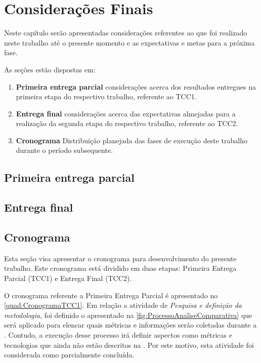 \chapter{Considerações Finais}

Neste capítulo serão apresentadas considerações referentes ao que foi realizado
neste trabalho até o presente momento e as expectativas e metas para a próxima
fase.

  As seções estão dispostas em:

  \begin{enumerate}
    \item \textbf{Primeira entrega parcial} considerações acerca dos resultados
    entregues na primeira etapa do respectivo trabalho, referente ao TCC1.
    \item \textbf{Entrega final} considerações acerca das expectativas almejadas
    para a realização da segunda etapa do respectivo trabalho, referente ao TCC2.
    \item \textbf{Cronograma} Distribuição planejada das fases de execução deste
    trabalho durante o período subsequente.
  \end{enumerate}

\section{Primeira entrega parcial}
\section{Entrega final}
\section{Cronograma}

Esta seção visa apresentar o cronograma para desenvolvimento do presente trabalho. Este
cronograma está dividido em duas etapas: Primeira Entrega Parcial (TCC1) e Entrega Final
(TCC2).

O cronograma referente a Primeira Entrega Parcial é apresentado no \autoref{quad:CronogramaTCC1}.
Em relação a atividade de \textit{Pesquisa e definição da metodologia}, foi definido o
 apresentado na \autoref{fig:ProcessoAnaliseComparativa}
que será aplicado para elencar quais métricas e informações serão coletadas durante a
.  Contudo, a execução desse processo irá definir aspectos como métricas
e tecnologias que ainda não estão descritos na . Por este motivo,
esta atividade foi considerada como parcialmente concluída.

